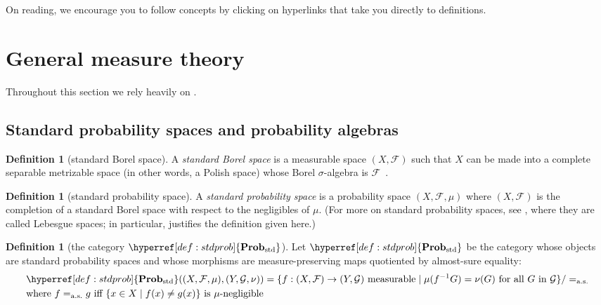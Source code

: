 \documentclass[
  sigconf,
  screen, ]{acmart}
\theoremstyle{definition}
\newtheorem{definition}[theorem]{Definition}
\newcommand\calF{\mathcal F}
\newcommand\calG{\mathcal G}
\newcommand\fremlinf[3]{\cite[\href{https://www1.essex.ac.uk/maths/people/fremlin/chap#2.pdf\#page=#3}{#1}]{fremlin2000measure}}
\newcommand\nref[2]{\hyperref[#1]{#2}} \newcommand\checkhigh{{\huge{\color{red}\textbf{TODO: check}}}}
\newcommand\aseq{=_{\rm a.s.}}
\newcommand\texStdProb{\mathbf{Prob}_{\rm std}}
\newcommand\StdProb{{\nref{def:stdprob}{\texStdProb}}}
\begin{document}
On reading, we encourage you to follow concepts by clicking on 
hyperlinks that take you directly to definitions.

\section{General measure theory} \label{app:sec:measure-theory}
Throughout this section we rely heavily on \citet{fremlin2000measure}.

\subsection{Standard probability spaces and probability algebras}

\begin{definition}[standard Borel space] \label{app:def:sbs}
  A \emph{standard Borel space}
  is a measurable space $(X,\calF)$
  such that $X$ can be made into a complete separable metrizable
  space (in other words, a Polish space) whose Borel $\sigma$-algebra is $\calF$~\fremlinf{424A}{42}{30}.
\end{definition}

\begin{definition}[standard probability space] \label{app:def:sps}
  A \emph{standard probability space}
  is a probability space $(X,\calF,\mu)$
  where $(X,\calF)$ is the completion of a standard Borel space
  with respect to the negligibles of $\mu$.
  (For more on standard probability spaces,
  see \citet{rohlin1949fundamental},
  where they are called Lebesgue spaces;
  in particular, \citet[\S 2.7]{rohlin1949fundamental} justifies the definition given here.)
\end{definition}

\begin{definition}[the category $\StdProb$] \label{app:def:stdprob}
  Let $\StdProb$
  be the category whose objects are standard
  probability spaces
  and whose morphisms are measure-preserving maps
  quotiented by almost-sure equality:
  \begin{align*}
    &\StdProb((X, \calF,\mu), (Y,\calG,\nu))
    = \{ f : (X,\calF)\to(Y,\calG)\text{ measurable}
    \mid \mu(f^{-1}G) = \nu(G)\text{ for all $G$ in $\calG$}
    \}/\aseq\\
    &\text{where $f\aseq g$ iff $\{x\in X\mid f(x)\ne g(x)\}$ is $\mu$-negligible}
  \end{align*}
\end{definition}
\end{document}
